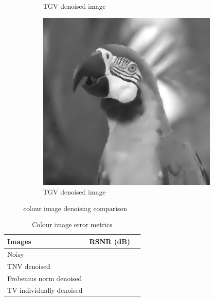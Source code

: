 \documentclass{article}
\begin{document}
\begin{figure}[htbp]
\begin{subfigure}[b]{0.24\textwidth}
        \caption{TGV denoised image}
        \label{fig:TFVdenoised_colour}
    \end{subfigure}
    \begin{subfigure}[b]{0.24\textwidth}
        \centering
        \includegraphics[width=\textwidth]{images/TGVdenoised_gray.png}
        \caption{TGV denoised image}
        \label{fig:TVdenoised_colour}
    \end{subfigure}
    \vspace{.3cm}

    \caption{colour image denoising comparison}
    \label{fig:colour_comparison}
\end{figure}

\begin{table}[htbp]
    \centering
    \begin{tabular}{| l | l | l |} 
        \hline
        \textbf{Images} & \textbf{RSNR (dB)} \\ [0.5ex] 
        \hline\hline
        Noisy &  \\ 
        \hline
        TNV denoised &  \\
        \hline
        Frobenius norm denoised &  \\
        \hline
        TV individually denoised &  \\
        \hline
    \end{tabular}
    \caption{Colour image error metrics}
    \label{tab:colour_metrics}
\end{table}


 \label{bib}
\end{document}
